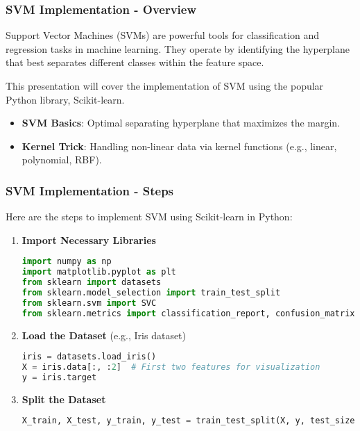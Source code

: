 \documentclass{beamer}
\begin{document}
\begin{frame}[fragile]
    \frametitle{SVM Implementation - Overview}
    Support Vector Machines (SVMs) are powerful tools for classification and regression tasks in machine learning. They operate by identifying the hyperplane that best separates different classes within the feature space.
    
    This presentation will cover the implementation of SVM using the popular Python library, Scikit-learn.
    
    \begin{itemize}
        \item \textbf{SVM Basics}: Optimal separating hyperplane that maximizes the margin.
        \item \textbf{Kernel Trick}: Handling non-linear data via kernel functions (e.g., linear, polynomial, RBF).
    \end{itemize}
\end{frame}

\begin{frame}[fragile]
    \frametitle{SVM Implementation - Steps}
    Here are the steps to implement SVM using Scikit-learn in Python:

    \begin{enumerate}
        \item \textbf{Import Necessary Libraries}
            \begin{lstlisting}[language=Python]
import numpy as np
import matplotlib.pyplot as plt
from sklearn import datasets
from sklearn.model_selection import train_test_split
from sklearn.svm import SVC
from sklearn.metrics import classification_report, confusion_matrix
            \end{lstlisting}

        \item \textbf{Load the Dataset} (e.g., Iris dataset)
            \begin{lstlisting}[language=Python]
iris = datasets.load_iris()
X = iris.data[:, :2]  # First two features for visualization
y = iris.target
            \end{lstlisting}

        \item \textbf{Split the Dataset}
            \begin{lstlisting}[language=Python]
X_train, X_test, y_train, y_test = train_test_split(X, y, test_size=0.3, random_state=42)
            \end{lstlisting}
    \end{enumerate}
\end{frame}
\end{document}
